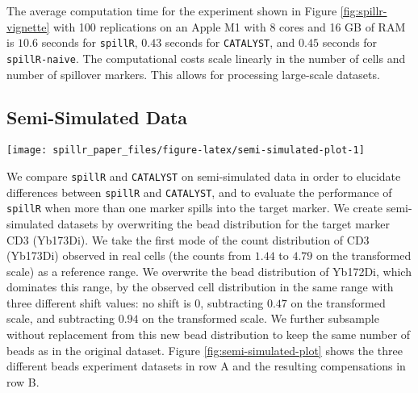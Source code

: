 \documentclass{bioinfo}
\begin{document}
The average computation time for the experiment shown in Figure
\ref{fig:spillr-vignette} with 100 replications on an Apple M1 with 8
cores and 16 GB of RAM is \(10.6\) seconds for \texttt{spillR}, \(0.43\)
seconds for \texttt{CATALYST}, and \(0.45\) seconds for
\texttt{spillR-naive}. The computational costs scale linearly in the
number of cells and number of spillover markers. This allows for
processing large-scale datasets.

\subsection{Semi-Simulated Data}

\label{semi-simulated-data}

\begin{figure*}

{\centering \texttt{[image: spillr\_paper\_files/figure-latex/semi-simulated-plot-1]} 

}

\caption{Comparison of compensation methods and uncorrected counts on semi-synthetic data (\texttt{spillR} and \texttt{spillR-naive} are set to impute spillover values with $0$). The vertical dashed line helps to interpret the spillover correction. It indicates the original mode of the bead distribution of Yb172Di at $2.7$, before overwriting it with the first peak of the real observations of Yb173Di. Counts are arcsinh transformed with cofactor of five \citep{bendall2011single}. The zero percentages are averages over all three experiments.}\label{fig:semi-simulated-plot}
\end{figure*}

We compare \texttt{spillR} and \texttt{CATALYST} on semi-simulated data
in order to elucidate differences between \texttt{spillR} and
\texttt{CATALYST}, and to evaluate the performance of \texttt{spillR}
when more than one marker spills into the target marker. We create
semi-simulated datasets by overwriting the bead distribution for the
target marker CD3 (Yb173Di). We take the first mode of the count
distribution of CD3 (Yb173Di) observed in real cells (the counts from
\(1.44\) to \(4.79\) on the transformed scale) as a reference range. We
overwrite the bead distribution of Yb172Di, which dominates this range,
by the observed cell distribution in the same range with three different
shift values: no shift is \(0\), subtracting \(0.47\) on the transformed
scale, and subtracting \(0.94\) on the transformed scale. We further
subsample without replacement from this new bead distribution to keep
the same number of beads as in the original dataset. Figure
\ref{fig:semi-simulated-plot} shows the three different beads experiment
datasets in row A and the resulting compensations in row B.
\end{document}

